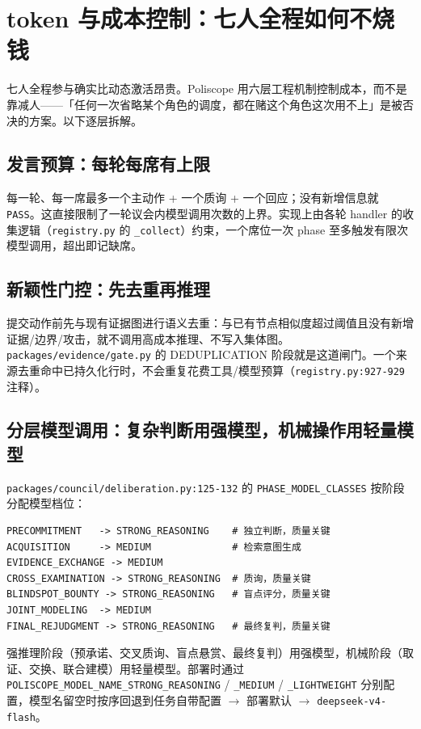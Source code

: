 \section{token 与成本控制：七人全程如何不烧钱}

七人全程参与确实比动态激活昂贵。Poliscope 用六层工程机制控制成本，而不是靠减人——「任何一次省略某个角色的调度，都在赌这个角色这次用不上」是被否决的方案。以下逐层拆解。

\subsection{发言预算：每轮每席有上限}

每一轮、每一席最多一个主动作 + 一个质询 + 一个回应；没有新增信息就 \texttt{PASS}。这直接限制了一轮议会内模型调用次数的上界。实现上由各轮 handler 的收集逻辑（\texttt{registry.py} 的 \texttt{\_collect}）约束，一个席位一次 phase 至多触发有限次模型调用，超出即记缺席。

\subsection{新颖性门控：先去重再推理}

提交动作前先与现有证据图进行语义去重：与已有节点相似度超过阈值且没有新增证据/边界/攻击，就不调用高成本推理、不写入集体图。\texttt{packages/evidence/gate.py} 的 DEDUPLICATION 阶段就是这道闸门。一个来源去重命中已持久化行时，不会重复花费工具/模型预算（\texttt{registry.py:927-929} 注释）。

\subsection{分层模型调用：复杂判断用强模型，机械操作用轻量模型}

\texttt{packages/council/deliberation.py:125-132} 的 \texttt{PHASE\_MODEL\_CLASSES} 按阶段分配模型档位：

\begin{lstlisting}
PRECOMMITMENT   -> STRONG_REASONING    # 独立判断，质量关键
ACQUISITION     -> MEDIUM              # 检索意图生成
EVIDENCE_EXCHANGE -> MEDIUM
CROSS_EXAMINATION -> STRONG_REASONING  # 质询，质量关键
BLINDSPOT_BOUNTY -> STRONG_REASONING   # 盲点评分，质量关键
JOINT_MODELING  -> MEDIUM
FINAL_REJUDGMENT -> STRONG_REASONING   # 最终复判，质量关键
\end{lstlisting}

强推理阶段（预承诺、交叉质询、盲点悬赏、最终复判）用强模型，机械阶段（取证、交换、联合建模）用轻量模型。部署时通过 \texttt{POLISCOPE\_MODEL\_NAME\_STRONG\_REASONING} / \texttt{\_MEDIUM} / \texttt{\_LIGHTWEIGHT} 分别配置，模型名留空时按序回退到任务自带配置 $\rightarrow$ 部署默认 $\rightarrow$ \texttt{deepseek-v4-flash}。

